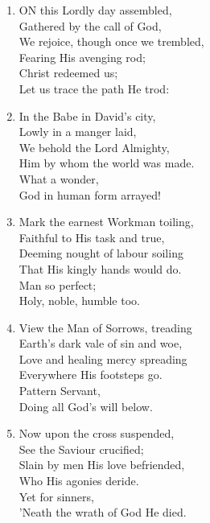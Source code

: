 \documentclass[11pt,a4paper]{article}
\begin{document}
\begin{enumerate}
    \item ON this Lordly day assembled, \\
        Gathered by the call of God, \\
        We rejoice, though once we trembled, \\
        Fearing His avenging rod; \\
        Christ redeemed us; \\
        Let us trace the path He trod:

    \item In the Babe in David's city, \\
        Lowly in a manger laid, \\
        We behold the Lord Almighty, \\
        Him by whom the world was made. \\
        What a wonder, \\
        God in human form arrayed!

    \item Mark the earnest Workman toiling, \\
        Faithful to His task and true, \\
        Deeming nought of labour soiling \\
        That His kingly hands would do. \\
        Man so perfect; \\
        Holy, noble, humble too.

    \item View the Man of Sorrows, treading \\
        Earth's dark vale of sin and woe, \\
        Love and healing mercy spreading \\
        Everywhere His footsteps go. \\
        Pattern Servant, \\
        Doing all God's will below.

    \item Now upon the cross suspended, \\
        See the Saviour crucified; \\
        Slain by men His love befriended, \\
        Who His agonies deride. \\
        Yet for sinners, \\
        'Neath the wrath of God He died.


\end{enumerate}
\end{document}
